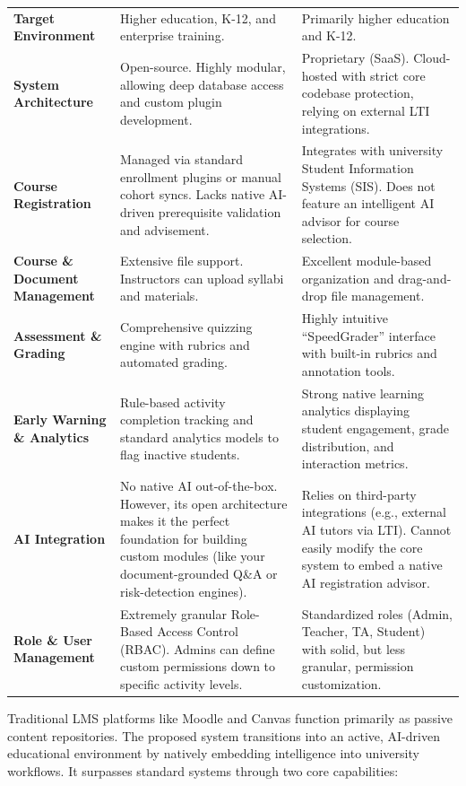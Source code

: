 \begin{xltabular}{\textwidth}{>{\bfseries}p{2.8cm} X X}
    Target Environment & Higher education, K-12, and enterprise training. & Primarily higher education and K-12. \\
    \addlinespace
    System Architecture & Open-source. Highly modular, allowing deep database access and custom plugin development. & Proprietary (SaaS). Cloud-hosted with strict core codebase protection, relying on external LTI integrations. \\
    \addlinespace
    Course Registration & Managed via standard enrollment plugins or manual cohort syncs. Lacks native AI-driven prerequisite validation and advisement. & Integrates with university Student Information Systems (SIS). Does not feature an intelligent AI advisor for course selection. \\
    \addlinespace
    Course \& Document Management & Extensive file support. Instructors can upload syllabi and materials. & Excellent module-based organization and drag-and-drop file management. \\
    \addlinespace
    Assessment \& Grading & Comprehensive quizzing engine with rubrics and automated grading. & Highly intuitive ``SpeedGrader'' interface with built-in rubrics and annotation tools. \\
    \addlinespace
    Early Warning \& Analytics & Rule-based activity completion tracking and standard analytics models to flag inactive students. & Strong native learning analytics displaying student engagement, grade distribution, and interaction metrics. \\
    \addlinespace
    AI Integration & No native AI out-of-the-box. However, its open architecture makes it the perfect foundation for building custom modules (like your document-grounded Q\&A or risk-detection engines). & Relies on third-party integrations (e.g., external AI tutors via LTI). Cannot easily modify the core system to embed a native AI registration advisor. \\
    \addlinespace
    Role \& User Management & Extremely granular Role-Based Access Control (RBAC). Admins can define custom permissions down to specific activity levels. & Standardized roles (Admin, Teacher, TA, Student) with solid, but less granular, permission customization. \\
\end{xltabular}

\noindent Traditional LMS platforms like Moodle and Canvas function primarily as passive content repositories. The proposed system transitions into an active, AI-driven educational environment by natively embedding intelligence into university workflows. It surpasses standard systems through two core capabilities:

